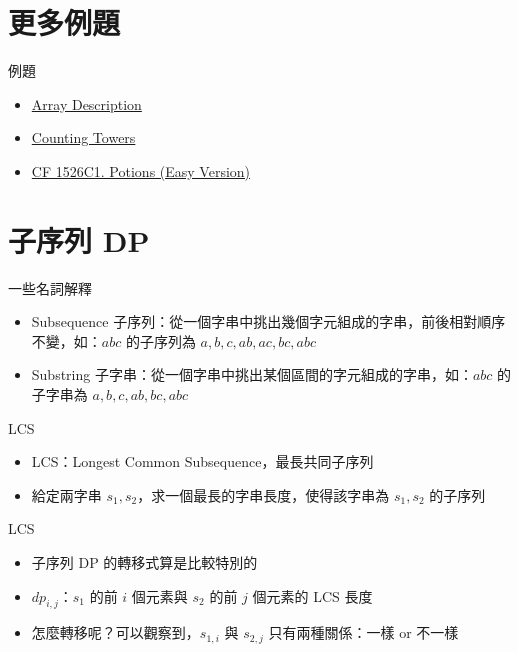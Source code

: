 \documentclass[aspectratio=169]{beamer}
\begin{document}
    \section{更多例題}

    \begin{frame}{例題}
        \begin{itemize}
            \item \href{https://cses.fi/problemset/task/1746}{Array Description}
            \item \href{https://cses.fi/problemset/task/2413}{Counting Towers}
            \item \href{https://codeforces.com/problemset/problem/1526/C1}{CF 1526C1. Potions (Easy Version)}
        \end{itemize}
    \end{frame}

    \section{子序列 DP}

    \begin{frame}{一些名詞解釋}
        \begin{itemize}
            \item Subsequence 子序列：從一個字串中挑出幾個字元組成的字串，前後相對順序不變，如：$abc$ 的子序列為 $a, b, c, ab, ac, bc, abc$
            \item Substring 子字串：從一個字串中挑出某個區間的字元組成的字串，如：$abc$ 的子字串為 $a, b, c, ab, bc, abc$
        \end{itemize}
    \end{frame}

    \begin{frame}{LCS}
        \begin{itemize}
            \item<1-> LCS：Longest Common Subsequence，最長共同子序列
            \item<2-> 給定兩字串 $s_1, s_2$，求一個最長的字串長度，使得該字串為 $s_1, s_2$ 的子序列
        \end{itemize}
    \end{frame}

    \begin{frame}{LCS}
        \begin{itemize}
            \item<1-> 子序列 DP 的轉移式算是比較特別的
            \item<2-> $dp_{i, j}$：$s_1$ 的前 $i$ 個元素與 $s_2$ 的前 $j$ 個元素的 LCS 長度
            \item<3-> 怎麼轉移呢？可以觀察到，$s_{1, i}$ 與 $s_{2, j}$ 只有兩種關係：一樣 or 不一樣
        \end{itemize}
    \end{frame}
\end{document}
